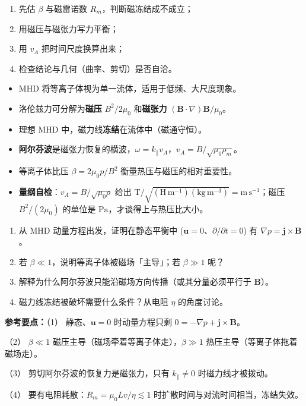 \documentclass[12pt,a4paper,openany,oneside]{book}
\newcommand{\quizans}[1]{\par\medskip{\color{figGray}\rule{\linewidth}{0.3pt}}\par\smallskip
  {\footnotesize\textbf{参考要点：}#1}}
\newcommand{\vect}[1]{\bm{#1}}
\newcommand{\grad}{\nabla}
\begin{document}
\begin{strategy}
\small
\begin{enumerate}[leftmargin=1.4em,itemsep=1pt,topsep=2pt]
\item 先估 $\beta$ 与磁雷诺数 $R_m$，判断磁冻结成不成立；
\item 用磁压与磁张力写力平衡；
\item 用 $v_A$ 把时间尺度换算出来；
\item 检查结论与几何（曲率、剪切）是否自洽。
\end{enumerate}
\end{strategy}

\begin{chapterreview}
\begin{itemize}
\item MHD 将等离子体视为单一流体，适用于低频、大尺度现象。
\item 洛伦兹力可分解为\textbf{磁压} $B^2/2\mu_0$ 和\textbf{磁张力} $(\vect{B}\cdot\grad)\vect{B}/\mu_0$。
\item 理想 MHD 中，磁力线\textbf{冻结}在流体中（磁通守恒）。
\item \textbf{阿尔芬波}是磁张力恢复的横波，$\omega = k_\parallel v_A$，$v_A = B/\sqrt{\mu_0\rho_m}$。
\item 等离子体比压 $\beta = 2\mu_0 p/B^2$ 衡量热压与磁压的相对重要性。
\item \textbf{量纲自检}：$v_A=B/\sqrt{\mu_0\rho}$ 给出 $\mathrm{T/\sqrt{(H\,m^{-1})(kg\,m^{-3})}}=\mathrm{m\,s^{-1}}$；磁压 $B^2/(2\mu_0)$ 的单位是 $\mathrm{Pa}$，才谈得上与热压比大小。
\end{itemize}
\end{chapterreview}

\begin{miniquiz}
\begin{enumerate}
\item 从 MHD 动量方程出发，证明在静态平衡中 ($\vect{u}=0$、$\partial/\partial t=0$) 有 $\grad p = \vect{j}\times\vect{B}$。
\item 若 $\beta \ll 1$，说明等离子体被磁场「主导」；若 $\beta \gg 1$ 呢？
\item 解释为什么阿尔芬波只能沿磁场方向传播（或其分量必须平行于 $\vect{B}$）。
\item 磁力线冻结被破坏需要什么条件？从电阻 $\eta$ 的角度讨论。
\end{enumerate}
\quizans{（1） 静态、$\vect u=0$ 时动量方程只剩 $0=-\grad p+\vect j\times\vect B$。\par （2） $\beta\ll1$ 磁压主导（磁场牵着等离子体走），$\beta\gg1$ 热压主导（等离子体拖着磁场走）。\par （3） 剪切阿尔芬波的恢复力是磁张力，只有 $k_\parallel\neq0$ 时磁力线才被拨动。\par （4） 要有电阻耗散：$R_m=\mu_0Lv/\eta\lesssim1$ 时扩散时间与对流时间相当，冻结失效。}
\end{miniquiz}
\end{document}

